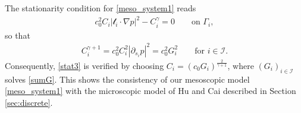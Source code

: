 \documentclass{article}
\numberwithin{equation}{section}
\begin{document}
The stationarity condition for \eqref{meso_system1} reads
\begin{align}   \label{stat3}
   c_0^2 C_i |\mathcal{t}_i\cdot\nabla p|^2 - C_i^\gamma = 0 \qquad\mbox{on }\Gamma_i,
\end{align}
so that
\begin{align*}
   {C}_i^{\gamma+1} = c_0^2 {C}_i^2 |\partial_{s_i}p|^2 = c_0^2 G_i^2 \qquad\mbox{for } i\in\mathcal{I}.
\end{align*}
Consequently, \eqref{stat3} is verified by choosing ${C}_i=(c_0 G_i)^{\frac{2}{\gamma +1}}$,
where $(G_i)_{i\in\mathcal{I}}$ solves \eqref{sumG}.
This shows the consistency of our mesoscopic model \eqref{meso_system1} with the microscopic model
of Hu and Cai \cite{hu2013adaptation} described in Section \ref{sec:discrete}.



\end{document}
